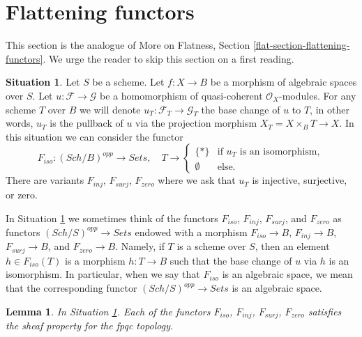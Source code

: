 \documentclass{stacks-project}
\theoremstyle{plain}
\newtheorem{lemma}[subsection]{Lemma}
\theoremstyle{definition}
\newtheorem{situation}[subsection]{Situation}
\theoremstyle{remark}
\numberwithin{equation}{subsection}
\def\Sch{\mathit{Sch}}
\begin{document}
\section{Flattening functors}
\label{section-F-zero}

\noindent
This section is the analogue of
More on Flatness, Section \ref{flat-section-flattening-functors}.
We urge the reader to skip this section on a first reading.

\begin{situation}
\label{situation-iso}
Let $S$ be a scheme.
Let $f : X \to B$ be a morphism of algebraic spaces over $S$.
Let $u : \mathcal{F} \to \mathcal{G}$ be a homomorphism of
quasi-coherent $\mathcal{O}_X$-modules. For any scheme $T$ over
$B$ we will denote $u_T : \mathcal{F}_T \to \mathcal{G}_T$ the
base change of $u$ to $T$, in other words, $u_T$ is the pullback
of $u$ via the projection morphism $X_T = X \times_B T \to X$.
In this situation we can consider the functor
\begin{equation}
\label{equation-iso}
F_{iso} : (\Sch/B)^{opp} \longrightarrow \textit{Sets}, \quad
T \longrightarrow \left\{
\begin{matrix}
\{*\} & \text{if }u_T\text{ is an isomorphism}, \\
\emptyset & \text{else.}
\end{matrix}
\right.
\end{equation}
There are variants $F_{inj}$, $F_{surj}$, $F_{zero}$ where we ask that
$u_T$ is injective, surjective, or zero.
\end{situation}

\noindent
In Situation \ref{situation-iso} we sometimes think of the functors
$F_{iso}$, $F_{inj}$, $F_{surj}$, and $F_{zero}$ as functors
$(\Sch/S)^{opp} \to \textit{Sets}$ endowed with a morphism
$F_{iso} \to B$, $F_{inj} \to B$, $F_{surj} \to B$, and $F_{zero} \to B$.
Namely, if $T$ is a scheme over $S$, then an element $h \in F_{iso}(T)$
is a morphism $h : T \to B$
such that the base change of $u$ via $h$ is an isomorphism.
In particular, when we say
that $F_{iso}$ is an algebraic space, we mean that the corresponding
functor $(\Sch/S)^{opp} \to \textit{Sets}$ is an algebraic space.

\begin{lemma}
\label{lemma-iso-sheaf}
In Situation \ref{situation-iso}.
Each of the functors $F_{iso}$, $F_{inj}$, $F_{surj}$, $F_{zero}$
satisfies the sheaf property for the fpqc topology.
\end{lemma}
\end{document}
